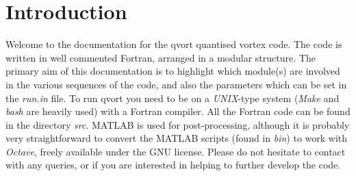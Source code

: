 \documentclass[12pt]{article}
\begin{document}
\maketitle
\pagestyle{plain}
\tableofcontents
\newpage
\clearpage
{}
\section{Introduction}\label{Sec:int}
  Welcome to the documentation for the {\sc qvort} quantised vortex code.
  The code is written in well commented Fortran, arranged in a modular structure.
  The primary aim of this documentation is to highlight which module(s) are involved in the various sequences of the code, 
  and also the parameters which can be set in the {\it run.in} file.
  To run {\sc qvort} you need to be on a {\it UNIX}-type system ({\it Make} and {\it bash} are heavily used) with a Fortran compiler.
  All the Fortran code can be found in the directory {\it src}.
  MATLAB is used for post-processing, although it is probably very straightforward to convert the MATLAB scripts (found in {\it bin}) to work with {\it Octave}, freely available under the GNU license.
  Please do not hesitate to contact with any queries, or if you are interested in helping to further develop the code.
\end{document}
